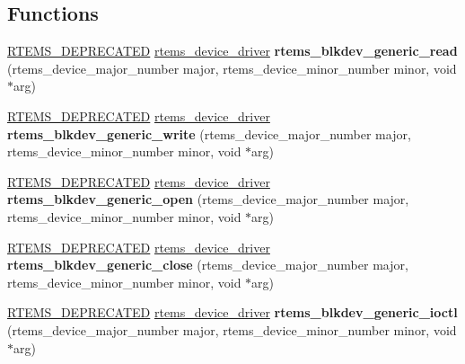 \subsection*{Functions}
\begin{DoxyCompactItemize}
\item 
\mbox{\label{group__rtems__blkdev__generic_ga27cc138d34395d2ecb851953cbdf7c02}} 
\mbox{\hyperlink{group__RTEMSScoreBaseDefs_gab651a076d4d51d50221e7ef7ac99d4e7}{R\+T\+E\+M\+S\+\_\+\+D\+E\+P\+R\+E\+C\+A\+T\+ED}} \mbox{\hyperlink{group__ClassicStatus_ga545d41846817eaba6143d52ee4d9e9fe}{rtems\+\_\+device\+\_\+driver}} {\bfseries rtems\+\_\+blkdev\+\_\+generic\+\_\+read} (rtems\+\_\+device\+\_\+major\+\_\+number major, rtems\+\_\+device\+\_\+minor\+\_\+number minor, void $\ast$arg)
\item 
\mbox{\label{group__rtems__blkdev__generic_ga7f0173e865e4fd26a02c712c21163a2a}} 
\mbox{\hyperlink{group__RTEMSScoreBaseDefs_gab651a076d4d51d50221e7ef7ac99d4e7}{R\+T\+E\+M\+S\+\_\+\+D\+E\+P\+R\+E\+C\+A\+T\+ED}} \mbox{\hyperlink{group__ClassicStatus_ga545d41846817eaba6143d52ee4d9e9fe}{rtems\+\_\+device\+\_\+driver}} {\bfseries rtems\+\_\+blkdev\+\_\+generic\+\_\+write} (rtems\+\_\+device\+\_\+major\+\_\+number major, rtems\+\_\+device\+\_\+minor\+\_\+number minor, void $\ast$arg)
\item 
\mbox{\label{group__rtems__blkdev__generic_gab11deab03ef01fa3fcb6d67263cfe274}} 
\mbox{\hyperlink{group__RTEMSScoreBaseDefs_gab651a076d4d51d50221e7ef7ac99d4e7}{R\+T\+E\+M\+S\+\_\+\+D\+E\+P\+R\+E\+C\+A\+T\+ED}} \mbox{\hyperlink{group__ClassicStatus_ga545d41846817eaba6143d52ee4d9e9fe}{rtems\+\_\+device\+\_\+driver}} {\bfseries rtems\+\_\+blkdev\+\_\+generic\+\_\+open} (rtems\+\_\+device\+\_\+major\+\_\+number major, rtems\+\_\+device\+\_\+minor\+\_\+number minor, void $\ast$arg)
\item 
\mbox{\label{group__rtems__blkdev__generic_gafb87307768af81f8c20c23e32bc2eb05}} 
\mbox{\hyperlink{group__RTEMSScoreBaseDefs_gab651a076d4d51d50221e7ef7ac99d4e7}{R\+T\+E\+M\+S\+\_\+\+D\+E\+P\+R\+E\+C\+A\+T\+ED}} \mbox{\hyperlink{group__ClassicStatus_ga545d41846817eaba6143d52ee4d9e9fe}{rtems\+\_\+device\+\_\+driver}} {\bfseries rtems\+\_\+blkdev\+\_\+generic\+\_\+close} (rtems\+\_\+device\+\_\+major\+\_\+number major, rtems\+\_\+device\+\_\+minor\+\_\+number minor, void $\ast$arg)
\item 
\mbox{\label{group__rtems__blkdev__generic_gae85c2bc536561048a6ddc26bbfa34c8b}} 
\mbox{\hyperlink{group__RTEMSScoreBaseDefs_gab651a076d4d51d50221e7ef7ac99d4e7}{R\+T\+E\+M\+S\+\_\+\+D\+E\+P\+R\+E\+C\+A\+T\+ED}} \mbox{\hyperlink{group__ClassicStatus_ga545d41846817eaba6143d52ee4d9e9fe}{rtems\+\_\+device\+\_\+driver}} {\bfseries rtems\+\_\+blkdev\+\_\+generic\+\_\+ioctl} (rtems\+\_\+device\+\_\+major\+\_\+number major, rtems\+\_\+device\+\_\+minor\+\_\+number minor, void $\ast$arg)
\end{DoxyCompactItemize}
